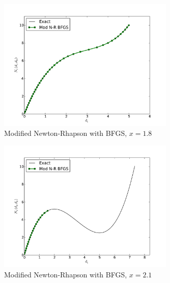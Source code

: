 \documentclass[12pt]{article}
\begin{document}
\begin{figure}[h!]
\centering
\includegraphics[width=0.75\textwidth]{MNR_BFGS18.pdf}
\caption{Modified Newton-Rhapson with BFGS, $x=1.8$}
\end{figure}
\begin{figure}[h!]
\centering
\includegraphics[width=0.75\textwidth]{MNR_BFGS21.pdf}
\caption{Modified Newton-Rhapson with BFGS, $x=2.1$}
\end{figure}
\end{document}

